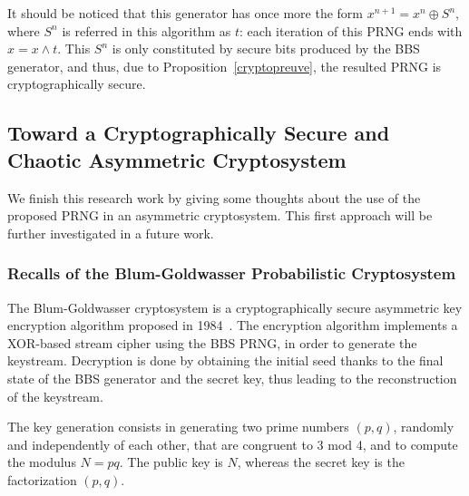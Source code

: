 \documentclass{article}
\begin{document}
It should  be noticed that this generator has once more the form $x^{n+1} = x^n \oplus S^n$,
where $S^n$ is referred in this algorithm as $t$: each iteration of this
PRNG ends with $x = x \wedge t$. This $S^n$ is only constituted
by secure bits produced by the BBS generator, and thus, due to
Proposition~\ref{cryptopreuve}, the resulted PRNG is cryptographically
secure.



\subsection{Toward a Cryptographically Secure and Chaotic Asymmetric Cryptosystem}
\label{Blum-Goldwasser}
We finish this research work by giving some thoughts about the use of
the proposed PRNG in an asymmetric cryptosystem.
This first approach will be further investigated in a future work.

\subsubsection{Recalls of the Blum-Goldwasser Probabilistic Cryptosystem}

The Blum-Goldwasser cryptosystem is a cryptographically secure asymmetric key encryption algorithm 
proposed in 1984~\cite{Blum:1985:EPP:19478.19501}.  The encryption algorithm 
implements a XOR-based stream cipher using the BBS PRNG, in order to generate 
the keystream. Decryption is done by obtaining the initial seed thanks to
the final state of the BBS generator and the secret key, thus leading to the
 reconstruction of the keystream.

The key generation consists in generating two prime numbers $(p,q)$, 
randomly and independently of each other, that are
 congruent to 3 mod 4, and to compute the modulus $N=pq$.
The public key is $N$, whereas the secret key is the factorization $(p,q)$.
\end{document}
